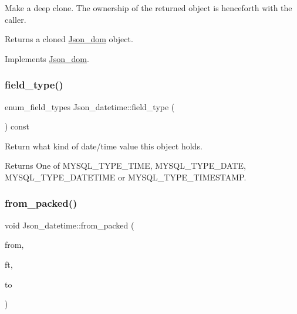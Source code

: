 Make a deep clone. The ownership of the returned object is henceforth with the caller.

\begin{DoxyReturn}{Returns}
a cloned \mbox{\hyperlink{classJson__dom}{Json\+\_\+dom}} object. 
\end{DoxyReturn}


Implements \mbox{\hyperlink{classJson__dom_a03c529d590cc4cdb747ccb82f4b70fb5}{Json\+\_\+dom}}.

\mbox{\label{classJson__datetime_a31c8a7a17013d92434f033dbb787df70}} 
\subsubsection{\texorpdfstring{field\+\_\+type()}{field\_type()}}
{\footnotesize\ttfamily enum\+\_\+field\+\_\+types Json\+\_\+datetime\+::field\+\_\+type (\begin{DoxyParamCaption}{ }\end{DoxyParamCaption}) const\hspace{0.3cm}{\ttfamily [inline]}}

Return what kind of date/time value this object holds. \begin{DoxyReturn}{Returns}
One of M\+Y\+S\+Q\+L\+\_\+\+T\+Y\+P\+E\+\_\+\+T\+I\+ME, M\+Y\+S\+Q\+L\+\_\+\+T\+Y\+P\+E\+\_\+\+D\+A\+TE, M\+Y\+S\+Q\+L\+\_\+\+T\+Y\+P\+E\+\_\+\+D\+A\+T\+E\+T\+I\+ME or M\+Y\+S\+Q\+L\+\_\+\+T\+Y\+P\+E\+\_\+\+T\+I\+M\+E\+S\+T\+A\+MP. 
\end{DoxyReturn}
\mbox{\label{classJson__datetime_ab7477e110d3a4d88a7caf6c5559db1be}} 
\subsubsection{\texorpdfstring{from\+\_\+packed()}{from\_packed()}}
{\footnotesize\ttfamily void Json\+\_\+datetime\+::from\+\_\+packed (\begin{DoxyParamCaption}\item[{const char $\ast$}]{from,  }\item[{enum\+\_\+field\+\_\+types}]{ft,  }\item[{M\+Y\+S\+Q\+L\+\_\+\+T\+I\+ME $\ast$}]{to }\end{DoxyParamCaption})\hspace{0.3cm}{\ttfamily [static]}}

